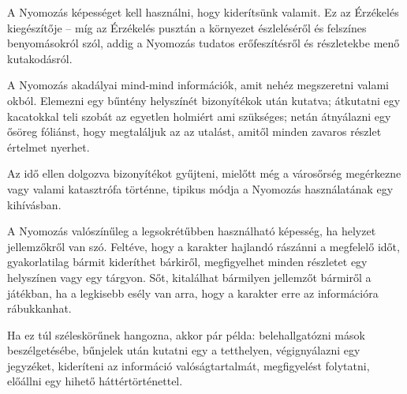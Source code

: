 
A Nyomozás képességet kell használni, hogy kiderítsünk valamit. Ez az Érzékelés kiegészítője -- míg az Érzékelés pusztán a környezet észleléséről és felszínes benyomásokról szól, addig a Nyomozás tudatos erőfeszítésről és részletekbe menő kutakodásról.

\overcome A Nyomozás akadályai mind-mind információk, amit nehéz megszeretni valami okból. Elemezni egy bűntény helyszínét bizonyítékok után kutatva; átkutatni egy kacatokkal teli szobát az egyetlen holmiért ami szükséges; netán átnyálazni egy ősöreg fóliánst, hogy megtaláljuk az az utalást, amitől minden zavaros részlet értelmet nyerhet.

Az idő ellen dolgozva bizonyítékot gyűjteni, mielőtt még a városőrség megérkezne vagy valami katasztrófa történne, tipikus módja a Nyomozás használatának egy kihívásban.

\advantage A Nyomozás valószínűleg a legsokrétűbben használható képesség, ha helyzet jellemzőkről van szó. Feltéve, hogy a karakter hajlandó rászánni a megfelelő időt, gyakorlatilag bármit kideríthet bárkiről, megfigyelhet minden részletet egy helyszínen vagy egy tárgyon. Sőt, kitalálhat bármilyen jellemzőt bármiről a játékban, ha a legkisebb esély van arra, hogy a karakter erre az információra rábukkanhat.

Ha ez túl széleskörűnek hangozna, akkor pár példa: belehallgatózni mások beszélgetésébe, bűnjelek után kutatni egy a tetthelyen, végignyálazni egy jegyzéket, kideríteni az információ valóságtartalmát, megfigyelést folytatni, előállni egy hihető háttértörténettel.

\noattackatall
 
\nodefendatall



